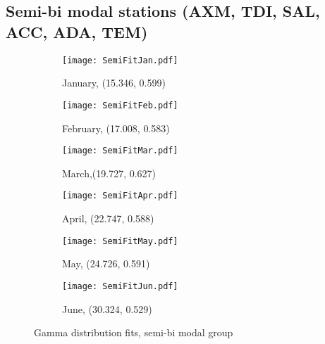 \documentclass{article}
\begin{document}
	\subsection{Semi-bi modal stations (AXM, TDI, SAL, ACC, ADA, TEM)}
	
	\begin{figure}[H]
		\ContinuedFloat*
		\centering
		\begin{subfigure}{0.5\textwidth}
			\centering
			\texttt{[image: SemiFitJan.pdf]}
			\caption{January, (15.346, 0.599)}
		\end{subfigure}%
		\begin{subfigure}{0.5\textwidth}
			\centering
			\texttt{[image: SemiFitFeb.pdf]}
			\caption{February, (17.008, 0.583)}
		\end{subfigure}
		\begin{subfigure}{0.5\textwidth}
			\centering
			\texttt{[image: SemiFitMar.pdf]}
			\caption{March,(19.727, 0.627)}
		\end{subfigure}%
		\begin{subfigure}{0.5\textwidth}
			\centering
			\texttt{[image: SemiFitApr.pdf]}
			\caption{April, (22.747, 0.588)}
		\end{subfigure}
		\begin{subfigure}{0.5\textwidth}
			\centering
			\texttt{[image: SemiFitMay.pdf]}
			\caption{May, (24.726, 0.591)}
		\end{subfigure}%
		\begin{subfigure}{0.5\textwidth}
			\centering
			\texttt{[image: SemiFitJun.pdf]}
			\caption{June, (30.324, 0.529)}
		\end{subfigure}
		\caption{Gamma distribution fits, semi-bi modal group}
		\label{GammaFitSemi}
	\end{figure}
\end{document}

